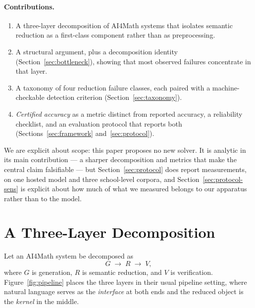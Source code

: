 \documentclass[11pt,a4paper]{article}
\begin{document}
\paragraph{Contributions.}
\begin{enumerate}
  \item A three-layer decomposition of AI4Math systems that isolates semantic
        reduction as a first-class component rather than as preprocessing.
  \item A structural argument, plus a decomposition identity
        (Section~\ref{sec:bottleneck}), showing that most observed failures
        concentrate in that layer.
  \item A taxonomy of four reduction failure classes, each paired with a
        machine-checkable detection criterion (Section~\ref{sec:taxonomy}).
  \item \emph{Certified accuracy} as a metric distinct from reported accuracy, a
        reliability checklist, and an evaluation protocol that reports both
        (Sections~\ref{sec:framework} and~\ref{sec:protocol}).
\end{enumerate}

We are explicit about scope: this paper proposes no new solver.  It is analytic
in its main contribution --- a sharper decomposition and metrics that make the
central claim falsifiable --- but Section~\ref{sec:protocol} does report
measurements, on one hosted model and three school-level corpora, and
Section~\ref{sec:protocol-sens} is explicit about how much of what we measured
belongs to our apparatus rather than to the model.

\section{A Three-Layer Decomposition}
\label{sec:decomp}

Let an AI4Math system be decomposed as
\begin{equation}
  G \;\longrightarrow\; R \;\longrightarrow\; V,
  \label{eq:pipeline}
\end{equation}
where $G$ is generation, $R$ is semantic reduction, and $V$ is verification.
Figure~\ref{fig:pipeline} places the three layers in their usual pipeline
setting, where natural language serves as the \emph{interface} at both ends and
the reduced object is the \emph{kernel} in the middle.
\end{document}
